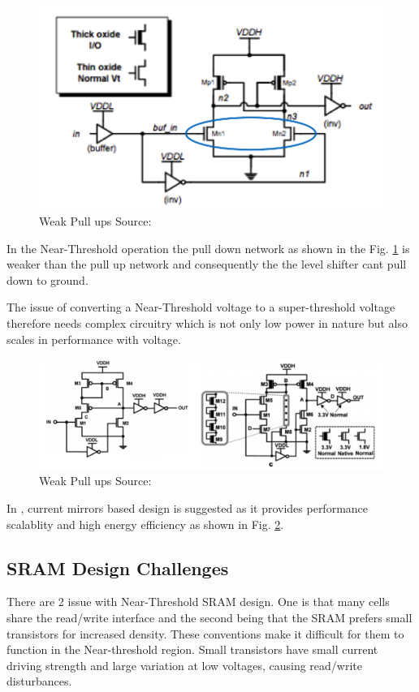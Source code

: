 \documentclass[conference]{IEEEtran}
\begin{document}
\begin{figure}[htbp]
	\includegraphics[width=\linewidth]{img/Pictures/Level_shift_weak.png}
	\centering
	\caption{Weak Pull ups Source: \cite{b3}}
	\label{fig:Weak_Pull_ups}
\end{figure}

In the Near-Threshold operation the pull down network as shown in the Fig. \ref{fig:Weak_Pull_ups} is weaker than the pull up network and consequently the the level shifter cant pull down to ground.

The issue of converting a Near-Threshold voltage to a super-threshold voltage
therefore needs complex circuitry which is not only low power in nature but
also scales in performance with voltage. 

\begin{figure}[htbp]
	\includegraphics[width=\linewidth]{img/Pictures/Level_shifter_solution.png}
	\centering
	\caption{Weak Pull ups Source: \cite{b6}}
	\label{fig:Level_shifter_solution}
\end{figure}

In \cite{b4}\cite{b5}\cite{b6}, current mirrors based design is suggested as it provides performance scalablity
and high energy efficiency as shown in Fig. \ref{fig:Level_shifter_solution}.

\subsection{SRAM Design Challenges}
There are 2 issue with Near-Threshold SRAM design. One is that many cells share the read/write interface and the second being that the SRAM prefers small transistors for increased density. These conventions make it difficult for them to function in the Near-threshold region. Small transistors have small current driving strength and large variation at low voltages, causing read/write disturbances.
\end{document}
